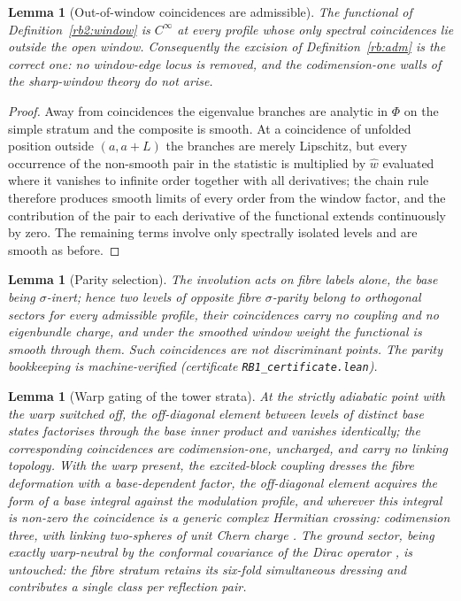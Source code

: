 \documentclass[11pt]{article}
\numberwithin{equation}{section}
\theoremstyle{plain}
\newtheorem{lemma}[theorem]{Lemma}
\theoremstyle{definition}
\theoremstyle{remark}
\begin{document}
\begin{lemma}[Out-of-window coincidences are
admissible]\label{rb2:adm}
The functional of Definition~\textup{\ref{rb2:window}} is
$C^{\infty}$ at every profile whose only spectral coincidences lie
outside the open window. Consequently the excision of
Definition~\textup{\ref{rb:adm}} is the correct one: no window-edge
locus is removed, and the codimension-one walls of the sharp-window
theory do not arise.
\end{lemma}

\begin{proof}
Away from coincidences the eigenvalue branches are analytic in
$\Phi$ on the simple stratum \cite{Kato} and the composite is
smooth. At a coincidence of unfolded position outside $(a, a+L)$
the branches are merely Lipschitz, but every occurrence of the
non-smooth pair in the statistic is multiplied by $\hat{w}$
evaluated where it vanishes to infinite order together with all
derivatives; the chain rule therefore produces smooth limits of
every order from the window factor, and the contribution of the
pair to each derivative of the functional extends continuously by
zero. The remaining terms involve only spectrally isolated levels
and are smooth as before.
\end{proof}

\begin{lemma}[Parity selection]\label{rb1:parity}
The involution acts on fibre labels alone, the base being
$\sigma$-inert; hence two levels of opposite fibre $\sigma$-parity
belong to orthogonal sectors for every admissible profile, their
coincidences carry no coupling and no eigenbundle charge, and under
the smoothed window weight the functional is smooth through them.
Such coincidences are not discriminant points. The parity
bookkeeping is machine-verified (certificate
\texttt{RB1\_certificate.lean}).
\end{lemma}

\begin{lemma}[Warp gating of the tower strata]\label{rb1:gate}
At the strictly adiabatic point with the warp switched off, the
off-diagonal element between levels of distinct base states
factorises through the base inner product and vanishes identically;
the corresponding coincidences are codimension-one, uncharged, and
carry no linking topology. With the warp present, the excited-block
coupling dresses the fibre deformation with a base-dependent
factor, the off-diagonal element acquires the form of a base
integral against the modulation profile, and wherever this integral
is non-zero the coincidence is a generic complex Hermitian
crossing: codimension three, with linking two-spheres of unit Chern
charge \cite{vonNeumannWigner1929, Berry1984, Simon1983}. The
ground sector, being exactly warp-neutral by the conformal
covariance of the Dirac operator
\cite{Hitchin1974, Hijazi, BourguignonGauduchon1992}, is untouched:
the fibre stratum retains its six-fold simultaneous dressing and
contributes a single class per reflection pair.
\end{lemma}
\end{document}
